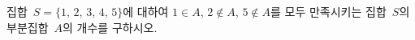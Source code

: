 집합~$S=\{1,\,2,\,3,\,4,\,5\}$에 대하여 $1\in A$, $2\notin A$, $5\notin A$를 모두 만족시키는 집합~$S$의 부분집합~$A$의 개수를 구하시오.
